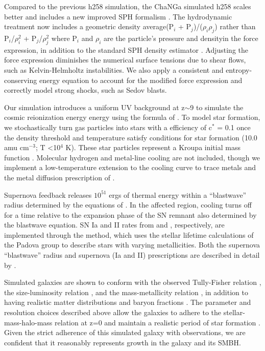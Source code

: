 \documentclass[]{emulateapj}
\begin{document}
Compared to the previous h258 simulation, the ChaNGa simulated h258 scales better and includes a new improved SPH formalism \citep{Keller2014}. The hydrodynamic treatment now includes a geometric density average\textemdash (P$_i$ + P$_j$)/($\rho_i \rho_j$) rather than P$_i$/$\rho_{i}^2$ + P$_j$/$\rho_{j}^2$ where P$_i$ and $\rho_i$ are the particle's pressure and density\textemdash in the force expression, in addition to the standard SPH density estimator \citep{Ritchie2001}. Adjusting the force expression diminishes the numerical surface tensions due to shear flows, such as Kelvin-Helmholtz instabilities. We also apply a consistent and entropy-conserving energy equation to account for the modified force expression and correctly model strong shocks, such as Sedov blasts.

Our simulation introduces a uniform UV background at z$\sim$9 to simulate the cosmic reionization energy energy using the formula of \cite{Haardt2012}. To model star formation, we stochastically turn gas particles into stars with a efficiency of c$^*$ = 0.1 once the density threshold and temperature satisfy conditions for star formation (10.0 amu cm$^{-3}$; T \textless 10$^4$ K). These star particles represent a Kroupa initial mass function \citep{Kroupa1993}. Molecular hydrogen and metal-line cooling are not included, though we implement a low-temperature extension to the cooling curve to trace metals \citep{Bromm2001} and the metal diffusion prescription of \cite{Shen2010}. 

Supernova feedback releases $10^{51}$ ergs of thermal energy within a ``blastwave'' radius determined by the equations of \cite{Ostriker1988}. In the affected region, cooling turns off for a time relative to the expansion phase of the SN remnant also determined by the blastwave equation. SN Ia and II rates from \cite{Thielemann1986} and \cite{Woosley1995}, respectively, are implemented through the \cite{Raiteri1996} method, which uses the stellar lifetime calculations of the Padova group \citep{Alongi1993, Bressan1993, Bertelli1994} to describe stars with varying metallicities. Both the supernova ``blastwave'' radius and supernova (Ia and II) prescriptions are described in detail by \cite{Stinson2006}. 

Simulated galaxies are shown to conform with the observed Tully-Fisher relation \citep{Governato2009}, the size-luminosity relation \citep{Brooks2011}, and the mass-metallicity relation \citep{Brooks2007,Christensen2015}, in addition to having realistic matter distributions and baryon fractions \citep{Governato2009a,Guedes2011}. The parameter and resolution choices described above allow the galaxies to adhere to the stellar-mass-halo-mass relation at z=0 and maintain a realistic period of star formation \citep{Moster2010,Munshi2013,Brooks2007,Maiolino2008}. Given the strict adherence of this simulated galaxy with observations, we are confident that it reasonably represents growth in the galaxy and its SMBH.
 
\end{document}
